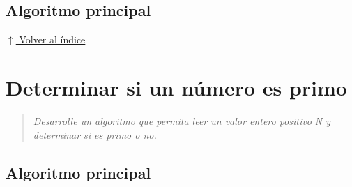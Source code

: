 \documentclass[12pt]{article}
\newcommand{\pseudocodigo}[2]{%
}
\newcommand{\volverindice}{%
    \vspace{1em}%
    \begin{flushright}%
        \hyperlink{indice}{\small $\uparrow$ Volver al índice}%
    \end{flushright}%
}
\newcommand{\enunciado}[1]{%
    \begin{quote}
        \itshape #1
    \end{quote}
}
\begin{document}
\subsection{Algoritmo principal}

\pseudocodigo{ej08_ordenar_dos}{Ordenar dos números}





\volverindice
\newpage


\section{Determinar si un número es primo}

\enunciado{Desarrolle un algoritmo que permita leer un valor entero positivo N y determinar si es primo o no.}

\subsection{Algoritmo principal}

\pseudocodigo{ej09_es_primo}{Determinar si N es primo}



\end{document}
